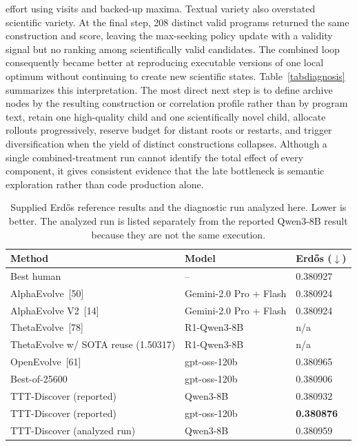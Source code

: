 \documentclass{article}
\begin{document}
effort using visits and backed-up maxima. Textual variety also overstated scientific variety. At the final step, 208 distinct valid programs returned the same construction and score, leaving the max-seeking policy update with a validity signal but no ranking among scientifically valid candidates. The combined loop consequently became better at reproducing executable versions of one local optimum without continuing to create new scientific states. Table~\ref{tabdiagnosis} summarizes this interpretation. The most direct next step is to define archive nodes by the resulting construction or correlation profile rather than by program text, retain one high-quality child and one scientifically novel child, allocate rollouts progressively, reserve budget for distant roots or restarts, and trigger diversification when the yield of distinct constructions collapses. Although a single combined-treatment run cannot identify the total effect of every component, it gives consistent evidence that the late bottleneck is semantic exploration rather than code production alone.

\begin{table}[t]
\centering
\small
\setlength{\tabcolsep}{7pt}
\begin{tabular}{@{}lll@{}}
\toprule
Method & Model & Erd\H{o}s ($\downarrow$) \\
\midrule
Best human & -- & 0.380927 \\
AlphaEvolve~[50] & Gemini-2.0 Pro + Flash & 0.380924 \\
AlphaEvolve V2~[14] & Gemini-2.0 Pro + Flash & 0.380924 \\
ThetaEvolve~[78] & R1-Qwen3-8B & n/a \\
ThetaEvolve w/ SOTA reuse (1.50317) & R1-Qwen3-8B & n/a \\
OpenEvolve~[61] & gpt-oss-120b & 0.380965 \\
Best-of-25600 & gpt-oss-120b & 0.380906 \\
\midrule
TTT-Discover (reported) & Qwen3-8B & 0.380932 \\
TTT-Discover (reported) & gpt-oss-120b & \textbf{0.380876} \\
TTT-Discover (analyzed run) & Qwen3-8B & 0.380959 \\
\bottomrule
\end{tabular}
\caption{Supplied Erd\H{o}s reference results and the diagnostic run analyzed here. Lower is better. The analyzed run is listed separately from the reported Qwen3-8B result because they are not the same execution.}
\label{tabbaselines}
\end{table}
\end{document}
